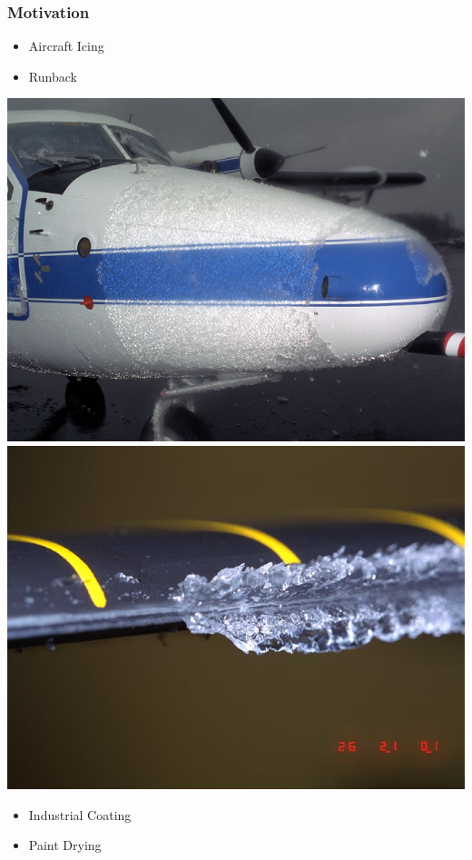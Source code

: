\documentclass[10pt]{beamer}
\begin{document}
    \begin{frame}
      \frametitle{Motivation}
      \begin{itemize}
        \item Aircraft Icing
        \item Runback
      \end{itemize}
      \begin{center}
        \includegraphics[scale=0.2]{Figures/Icing_on_a_plane.jpg}
        \hspace{0.1in}
        \includegraphics[scale=0.2]{Figures/Icing_on_a_rotor.jpg}
      \end{center}
      \begin{itemize}
        \item Industrial Coating
        \item Paint Drying
      \end{itemize}
    \end{frame}
\end{document}
